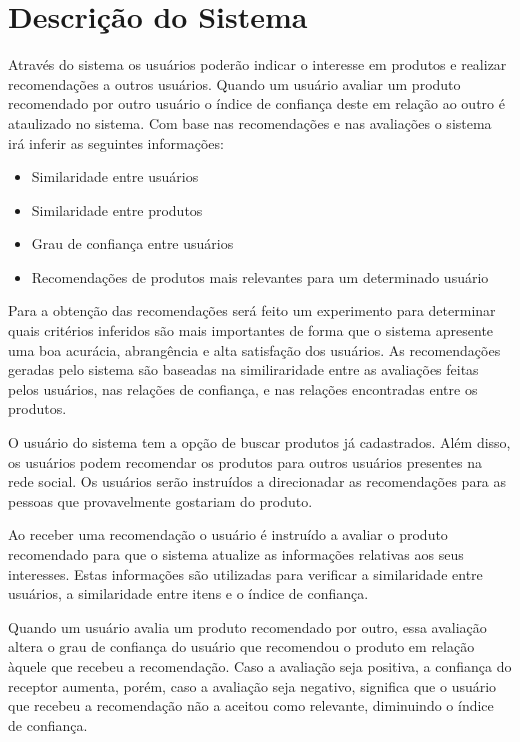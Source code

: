 
\section{Descrição do Sistema}

 Através do sistema os usuários poderão indicar o interesse em produtos e realizar recomendações a outros usuários. Quando um usuário avaliar um produto recomendado por outro usuário o índice de confiança deste em relação ao outro é ataulizado no sistema. Com base nas recomendações e nas avaliações o sistema irá inferir as seguintes informações:
 
\begin{itemize}

 \item Similaridade entre usuários

 \item Similaridade entre produtos

 \item Grau de confiança entre usuários

 \item Recomendações de produtos mais relevantes para um determinado usuário

\end{itemize}

 Para a obtenção das recomendações será feito um experimento para determinar quais critérios inferidos são mais importantes de forma que o sistema apresente uma boa acurácia, abrangência e alta satisfação dos usuários. As recomendações geradas pelo sistema são baseadas na similiraridade entre as avaliações feitas pelos usuários, nas relações de confiança, e nas relações encontradas entre os produtos.

  O usuário do sistema tem a opção de buscar produtos já cadastrados. Além disso, os usuários podem recomendar os produtos para outros usuários presentes na rede social. Os usuários serão instruídos a direcionadar as recomendações para as pessoas que provavelmente gostariam do produto.

 Ao receber uma recomendação o usuário é instruído a avaliar o produto recomendado para que o sistema atualize as informações relativas aos seus interesses. Estas informações são utilizadas para verificar a similaridade entre usuários, a similaridade entre itens e o índice de confiança.
 
 Quando um usuário avalia um produto recomendado por outro, essa avaliação altera o grau de confiança do usuário que recomendou o produto em relação àquele que recebeu a recomendação. Caso a avaliação seja positiva, a confiança do receptor aumenta, porém, caso a avaliação seja negativo, significa que o usuário que recebeu a recomendação não a aceitou como relevante, diminuindo o índice de confiança.

